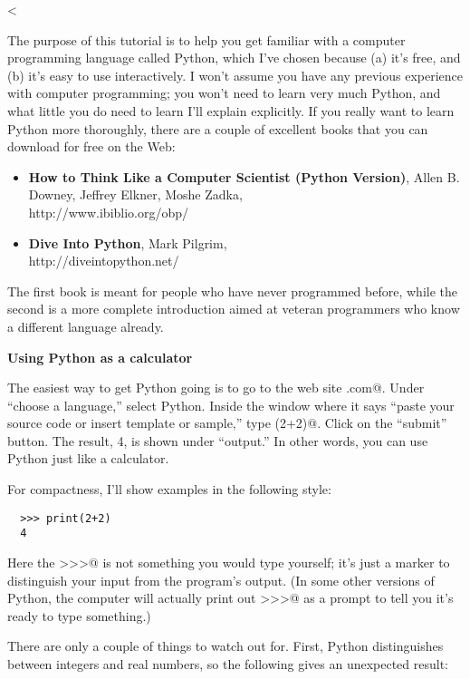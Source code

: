 <%

\label{pythonappendix}%
\newcommand\pythontryit[1]{\noindent\myindented{4mm}{\textsl{\textsf{Try it.}} \textsf{#1}}}


The purpose of this tutorial is to help you get familiar with 
a computer programming
language called Python, which I've chosen because (a) it's free, and (b)
it's easy to use interactively. I won't assume you have any previous
experience with computer programming; you won't need to learn very much
Python, and what little you do need to learn I'll explain explicitly. If
you really want to learn Python more thoroughly, there are a couple of
excellent books that you can download for free on the Web:
\begin{itemize}
\item[]\textbf{How to Think Like a Computer Scientist (Python Version)}, Allen B.
Dow\-ney, Jeffrey Elkner, Moshe Zadka,\\
http://www.ibiblio.org/obp/
\item[]\textbf{Dive Into Python}, Mark Pilgrim,\\
http://diveintopython.net/
\end{itemize}
The first book is meant for people who have never programmed before,
while the second is a more complete introduction aimed at veteran
programmers who know a different language already.

\textbf{Using Python as a calculator}

The easiest way to get Python going is to go to the web site \verb@ideone.com@.
Under ``choose a language,'' select Python. Inside the window where it says
``paste your source code or insert template or sample,'' type \verb@print(2+2)@.
Click on the ``submit'' button. The result, 4, is shown under ``output.''
In other words, you can use Python just like a calculator. 

For compactness, I'll show examples in the following style:
\begin{verbatim}
  >>> print(2+2)
  4
\end{verbatim}
Here the \verb@>>>@ is not something you would type yourself; it's just
a marker to distinguish your input from the program's output.
(In some other versions of Python, the computer will actually print out \verb@>>>@
as a prompt to tell you it's ready to type something.)

There are only a couple of things to watch out for. First, Python
distinguishes between integers and real numbers, so the following gives
an unexpected result:

